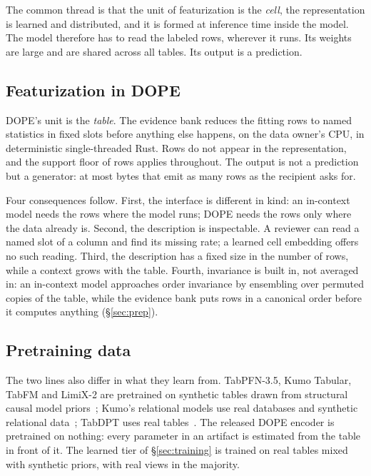 \documentclass[10pt,letterpaper,twocolumn]{article}
\begin{document}
The common thread is that the unit of featurization is the \emph{cell}, the representation is learned and distributed, and it is formed at inference time inside the model. The model therefore has to read the labeled rows, wherever it runs. Its weights are large and are shared across all tables. Its output is a prediction.

\subsection{Featurization in DOPE}
DOPE's unit is the \emph{table}. The evidence bank reduces the fitting rows to named statistics in fixed slots before anything else happens, on the data owner's CPU, in deterministic single-threaded Rust. Rows do not appear in the representation, and the support floor of  rows applies throughout. The output is not a prediction but a generator: at most  bytes that emit as many rows as the recipient asks for.

Four consequences follow. First, the interface is different in kind: an in-context model needs the rows where the model runs; DOPE needs the rows only where the data already is. Second, the description is inspectable. A reviewer can read a named slot of a column and find its missing rate; a learned cell embedding offers no such reading. Third, the description has a fixed size in the number of rows, while a context grows with the table. Fourth, invariance is built in, not averaged in: an in-context model approaches order invariance by ensembling over permuted copies of the table, while the evidence bank puts rows in a canonical order before it computes anything (\S\ref{sec:prep}).

\subsection{Pretraining data}
The two lines also differ in what they learn from. TabPFN-3.5, Kumo Tabular, TabFM and LimiX-2 are pretrained on synthetic tables drawn from structural causal model priors~\cite{tabpfn35,kumotabular,tabfm,limix2}; Kumo's relational models use real databases and synthetic relational data~\cite{kumorfm,kumorfm2}; TabDPT uses real tables~\cite{tabdpt}. The released DOPE encoder is pretrained on nothing: every parameter in an artifact is estimated from the table in front of it. The learned tier of \S\ref{sec:training} is trained on real tables mixed with synthetic priors, with real views in the majority.
\end{document}
